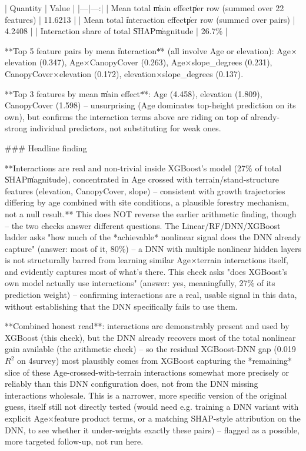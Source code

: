 | Quantity | Value |
|---|---:|
| Mean total \|main effect\| per row (summed over 22 features) | 11.6213 |
| Mean total \|interaction effect\| per row (summed over pairs) | 4.2408 |
| Interaction share of total \|SHAP\| magnitude | 26.7\% |

**Top 5 feature pairs by mean \|interaction\|** (all involve Age or elevation): Age$\times$elevation
(0.347), Age$\times$CanopyCover (0.263), Age$\times$slope\_degrees (0.231),
CanopyCover$\times$elevation (0.172), elevation$\times$slope\_degrees (0.137).

**Top 3 features by mean \|main effect\|**: Age (4.458), elevation (1.809), CanopyCover (1.598) --
unsurprising (Age dominates top-height prediction on its own), but confirms the interaction terms
above are riding on top of already-strong individual predictors, not substituting for weak ones.

### Headline finding

**Interactions are real and non-trivial inside XGBoost's model (27\% of total \|SHAP\| magnitude),
concentrated in Age crossed with terrain/stand-structure features (elevation, CanopyCover, slope) --
consistent with growth trajectories differing by age combined with site conditions, a plausible
forestry mechanism, not a null result.** This does NOT reverse the earlier arithmetic finding,
though -- the two checks answer different questions. The Linear/RF/DNN/XGBoost ladder asks "how
much of the *achievable* nonlinear signal does the DNN already capture" (answer: most of it, 80\%)
-- a DNN with multiple nonlinear hidden layers is not structurally barred from learning similar
Age$\times$terrain interactions itself, and evidently captures most of what's there. This check
asks "does XGBoost's own model actually use interactions" (answer: yes, meaningfully, 27\% of its
prediction weight) -- confirming interactions are a real, usable signal in this data, without
establishing that the DNN specifically fails to use them.

**Combined honest read**: interactions are demonstrably present and used by XGBoost (this check),
but the DNN already recovers most of the total nonlinear gain available (the arithmetic check) --
so the residual XGBoost-DNN gap (0.019 $R^2$ on 4survey) most plausibly comes from XGBoost
capturing the *remaining* slice of these Age-crossed-with-terrain interactions somewhat more
precisely or reliably than this DNN configuration does, not from the DNN missing interactions
wholesale. This is a narrower, more specific version of the original guess, itself still not
directly tested (would need e.g. training a DNN variant with explicit Age$\times$feature product
terms, or a matching SHAP-style attribution on the DNN, to see whether it under-weights exactly
these pairs) -- flagged as a possible, more targeted follow-up, not run here.
